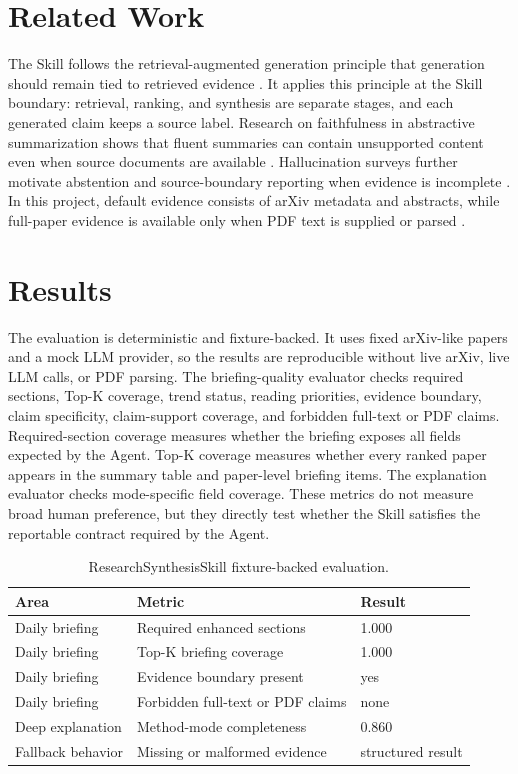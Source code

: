 \documentclass{article}
\begin{document}
\section{Related Work}

The Skill follows the retrieval-augmented generation principle that generation should remain tied to retrieved evidence \citep{lewis2020}. It applies this principle at the Skill boundary: retrieval, ranking, and synthesis are separate stages, and each generated claim keeps a source label. Research on faithfulness in abstractive summarization shows that fluent summaries can contain unsupported content even when source documents are available \citep{maynez2020}. Hallucination surveys further motivate abstention and source-boundary reporting when evidence is incomplete \citep{ji2023}. In this project, default evidence consists of arXiv metadata and abstracts, while full-paper evidence is available only when PDF text is supplied or parsed \citep{arxivapi}.

\section{Results}

The evaluation is deterministic and fixture-backed. It uses fixed arXiv-like papers and a mock LLM provider, so the results are reproducible without live arXiv, live LLM calls, or PDF parsing. The briefing-quality evaluator checks required sections, Top-K coverage, trend status, reading priorities, evidence boundary, claim specificity, claim-support coverage, and forbidden full-text or PDF claims. Required-section coverage measures whether the briefing exposes all fields expected by the Agent. Top-K coverage measures whether every ranked paper appears in the summary table and paper-level briefing items. The explanation evaluator checks mode-specific field coverage. These metrics do not measure broad human preference, but they directly test whether the Skill satisfies the reportable contract required by the Agent.

\begin{table}[t]
  \centering
  \caption{ResearchSynthesisSkill fixture-backed evaluation.}
  \label{tab:skill2-results}
  \small
  \begin{tabular}{@{}lll@{}}
    \toprule
    Area & Metric & Result \\
    \midrule
    Daily briefing & Required enhanced sections & 1.000 \\
    Daily briefing & Top-K briefing coverage & 1.000 \\
    Daily briefing & Evidence boundary present & yes \\
    Daily briefing & Forbidden full-text or PDF claims & none \\
    Deep explanation & Method-mode completeness & 0.860 \\
    Fallback behavior & Missing or malformed evidence & structured result \\
    \bottomrule
  \end{tabular}
\end{table}
\end{document}
